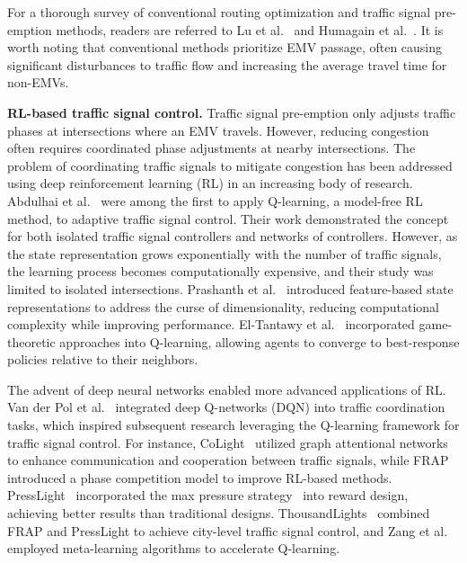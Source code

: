 For a thorough survey of conventional routing optimization and traffic signal pre-emption methods, readers are referred to Lu et al.~\cite{Lu2019Literature} and Humagain et al.~\cite{humagain2020systematic}. It is worth noting that conventional methods prioritize EMV passage, often causing significant disturbances to traffic flow and increasing the average travel time for non-EMVs.

\textbf{RL-based traffic signal control.}
Traffic signal pre-emption only adjusts traffic phases at intersections where an EMV travels. However, reducing congestion often requires coordinated phase adjustments at nearby intersections. The problem of coordinating traffic signals to mitigate congestion has been addressed using deep reinforcement learning (RL) in an increasing body of research. Abdulhai et al.~\cite{abdulhai2003reinforcement} were among the first to apply Q-learning, a model-free RL method, to adaptive traffic signal control. Their work demonstrated the concept for both isolated traffic signal controllers and networks of controllers. However, as the state representation grows exponentially with the number of traffic signals, the learning process becomes computationally expensive, and their study was limited to isolated intersections. Prashanth et al.~\cite{prashanth2010reinforcement} introduced feature-based state representations to address the curse of dimensionality, reducing computational complexity while improving performance. El-Tantawy et al.~\cite{el2013multiagent} incorporated game-theoretic approaches into Q-learning, allowing agents to converge to best-response policies relative to their neighbors.

The advent of deep neural networks enabled more advanced applications of RL. Van der Pol et al.~\cite{van2016coordinated} integrated deep Q-networks (DQN) into traffic coordination tasks, which inspired subsequent research leveraging the Q-learning framework for traffic signal control. For instance, CoLight~\cite{wei2019colight} utilized graph attentional networks to enhance communication and cooperation between traffic signals, while FRAP~\cite{zheng2019frap} introduced a phase competition model to improve RL-based methods. PressLight~\cite{wei2019presslight} incorporated the max pressure strategy~\cite{varaiya2013max, LI2019Backpressure, LEVIN2020maxpressure, WANG2022Learning, Lazar2021Routing} into reward design, achieving better results than traditional designs. ThousandLights~\cite{ThousandLights} combined FRAP and PressLight to achieve city-level traffic signal control, and Zang et al.~\cite{Zang_Yao_Zheng_Xu_Xu_Li_2020} employed meta-learning algorithms to accelerate Q-learning.

